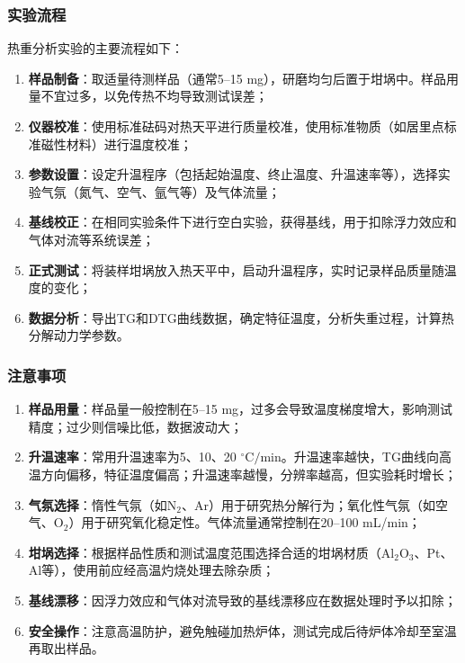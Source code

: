 \subsubsection{实验流程}

热重分析实验的主要流程如下：

\begin{enumerate}[label=(\arabic*)]
    \item \textbf{样品制备}：取适量待测样品（通常5--15 mg），研磨均匀后置于坩埚中。样品用量不宜过多，以免传热不均导致测试误差；
    \item \textbf{仪器校准}：使用标准砝码对热天平进行质量校准，使用标准物质（如居里点标准磁性材料）进行温度校准；
    \item \textbf{参数设置}：设定升温程序（包括起始温度、终止温度、升温速率等），选择实验气氛（氮气、空气、氩气等）及气体流量；
    \item \textbf{基线校正}：在相同实验条件下进行空白实验，获得基线，用于扣除浮力效应和气体对流等系统误差；
    \item \textbf{正式测试}：将装样坩埚放入热天平中，启动升温程序，实时记录样品质量随温度的变化；
    \item \textbf{数据分析}：导出TG和DTG曲线数据，确定特征温度，分析失重过程，计算热分解动力学参数。
\end{enumerate}

\subsubsection{注意事项}

\begin{enumerate}[label=(\arabic*)]
    \item \textbf{样品用量}：样品量一般控制在5--15 mg，过多会导致温度梯度增大，影响测试精度；过少则信噪比低，数据波动大；
    \item \textbf{升温速率}：常用升温速率为5、10、20 $\mathrm{^\circ C/min}$。升温速率越快，TG曲线向高温方向偏移，特征温度偏高；升温速率越慢，分辨率越高，但实验耗时增长；
    \item \textbf{气氛选择}：惰性气氛（如$\mathrm{N_2}$、Ar）用于研究热分解行为；氧化性气氛（如空气、$\mathrm{O_2}$）用于研究氧化稳定性。气体流量通常控制在20--100 mL/min；
    \item \textbf{坩埚选择}：根据样品性质和测试温度范围选择合适的坩埚材质（$\mathrm{Al_2O_3}$、Pt、Al等），使用前应经高温灼烧处理去除杂质；
    \item \textbf{基线漂移}：因浮力效应和气体对流导致的基线漂移应在数据处理时予以扣除；
    \item \textbf{安全操作}：注意高温防护，避免触碰加热炉体，测试完成后待炉体冷却至室温再取出样品。
\end{enumerate}

